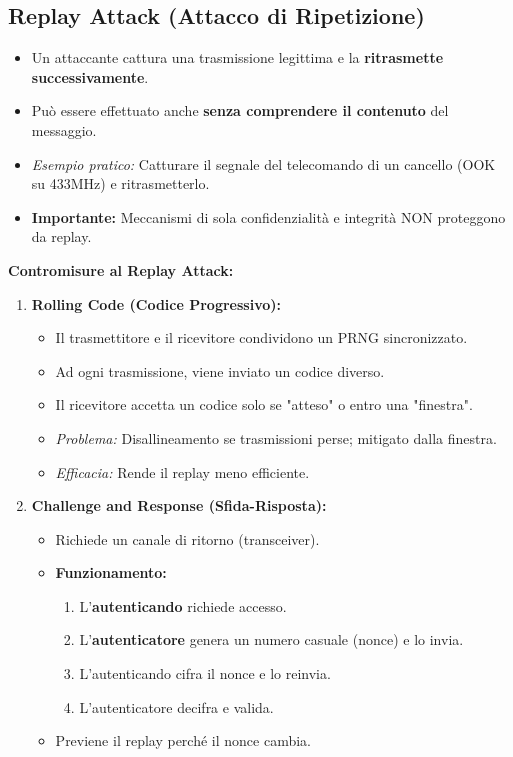 \subsection{Replay Attack (Attacco di Ripetizione)}
\begin{itemize}
    \item Un attaccante cattura una trasmissione legittima e la \textbf{ritrasmette successivamente}.
    \item Può essere effettuato anche \textbf{senza comprendere il contenuto} del messaggio.
    \item \textit{Esempio pratico:} Catturare il segnale del telecomando di un cancello (OOK su 433MHz) e ritrasmetterlo.
    \item \textbf{Importante:} Meccanismi di sola confidenzialità e integrità NON proteggono da replay.
\end{itemize}
\textbf{Contromisure al Replay Attack:}
\begin{enumerate}
    \item \textbf{Rolling Code (Codice Progressivo):}
    \begin{itemize}
        \item Il trasmettitore e il ricevitore condividono un PRNG sincronizzato.
        \item Ad ogni trasmissione, viene inviato un codice diverso.
        \item Il ricevitore accetta un codice solo se "atteso" o entro una "finestra".
        \item \textit{Problema:} Disallineamento se trasmissioni perse; mitigato dalla finestra.
        \item \textit{Efficacia:} Rende il replay meno efficiente.
    \end{itemize}
    \item \textbf{Challenge and Response (Sfida-Risposta):}
    \begin{itemize}
        \item Richiede un canale di ritorno (transceiver).
        \item \textbf{Funzionamento:}
        \begin{enumerate}
            \item L'\textbf{autenticando} richiede accesso.
            \item L'\textbf{autenticatore} genera un numero casuale (nonce) e lo invia.
            \item L'autenticando cifra il nonce e lo reinvia.
            \item L'autenticatore decifra e valida.
        \end{enumerate}
        \item Previene il replay perché il nonce cambia.
    \end{itemize}
\end{enumerate}

